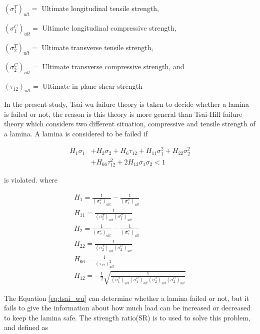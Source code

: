 \documentclass[Afour,sagev,times]{sagej}
\begin{document}
$(\sigma_1^T)_{ult}=$ Ultimate longitudinal tensile strength,

$(\sigma_1^C)_{ult}=$ Ultimate longitudinal compressive strength,

$(\sigma_2^T)_{ult}=$ Ultimate transverse tensile strength,

$(\sigma_2^C)_{ult}=$ Ultimate transverse compressive strength, and

$(\tau_{12})_{ult}=$ Ultimate in-plane shear strength

In the present study, Tsai-wu failure theory is taken to decide whether a lamina is failed or not, the
reason is this theory is  more general than Tsai-Hill failure theory which considers
two different situation, compressive and tensile strength of a lamina. A lamina is considered to be
failed if


\begin{equation} \label{eq:tsai_wu}
\begin{split}
	H_1 \sigma_1 & + H_2 \sigma_2 + H_6 \tau_{12} + H_{11}\sigma_1^2 + H_{22} \sigma_2^2 \\
                 & + H_{66}  \tau_{12}^2 + 2H_{12}\sigma_1\sigma_2 < 1
\end{split}
\end{equation}
 
is violated. where


\begin{equation}
	\begin{array}{l}
		H_{1}=\frac{1}{\left(\sigma_{1}^{T}\right)_{u l t}}-\frac{1}{\left(\sigma_{1}^{C}\right)_{u l
	t}} \\
	H_{11}=\frac{1}{\left(\sigma_{1}^{T}\right)_{u l t}\left(\sigma_{1}^{C}\right)_{u l t}} \\
	H_{2}=\frac{1}{\left(\sigma_{2}^{T}\right)_{u l t}}-\frac{1}{\left(\sigma_{2}^{C}\right)_{u l
	t}} \\
	H_{22}=\frac{1}{\left(\sigma_{2}^{T}\right)_{u l t}\left(\sigma_{2}^{C}\right)_{u l t}} \\
	H_{66}=\frac{1}{\left(\tau_{12}\right)_{u l t}^{2}} \\
	H_{12}=-\frac{1}{2} \sqrt{\frac{1}{\left(\sigma_{1}^{T}\right)_{u l
				t}\left(\sigma_{1}^{C}\right)_{u l t}\left(\sigma_{2}^{T}\right)_{u l
	t}\left(\sigma_{2}^{C}\right)_{u l t}}}
	\end{array}
\end{equation}


The Equation \ref{eq:tsai_wu} can determine whether a lamina failed or not, but it fails to give the
information about how much load can be increased or decreased to keep the lamina safe. The strength
ratio(SR) is to used to solve this problem, and defined as
\end{document}
